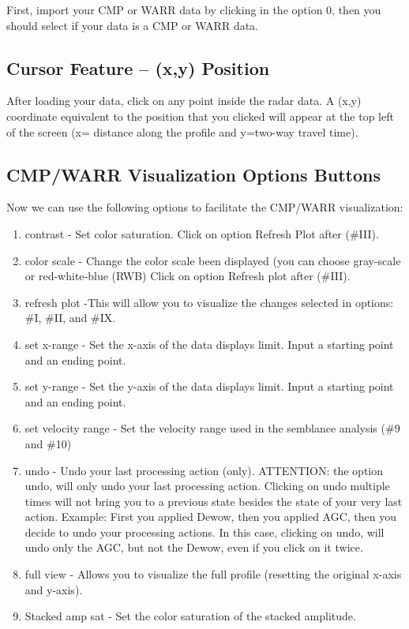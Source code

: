 \documentclass[12pt]{article}
\begin{document}
First, import your CMP or WARR data by clicking in the option 0, then you should select if your data is a CMP or WARR data.

	\subsection{Cursor Feature – (x,y) Position}
	
	After loading your data, click on any point inside the radar data. A (x,y) coordinate equivalent to the position that you clicked will appear at the top left of the screen (x= distance along the profile and y=two-way travel time). 
	

	\subsection{CMP/WARR Visualization Options Buttons }
	
	Now we can use the following options to facilitate the CMP/WARR visualization: 

\begin{enumerate}[label=\Roman*.]

    \item contrast - Set color saturation.  Click on option Refresh Plot after (\#III).

    \item color scale - Change the color scale been displayed (you can choose gray-scale or red-white-blue (RWB) Click on option Refresh plot after (\#III).

    \item refresh plot -This will allow you to visualize the changes selected in options: \#I, \#II, and \#IX.
    
    \item set x-range - Set the x-axis of the data displays limit. Input a starting point and an ending point.

    \item set y-range - Set the y-axis of the data displays limit. Input a starting point and an ending point.
 
    \item set velocity range - Set the velocity range used in the semblance analysis (\#9 and \#10)
 
    \item undo - Undo your last processing action (only). 
ATTENTION: the option undo, will only undo your last processing action. Clicking on undo multiple times will not bring you to a previous state besides the state of your very last action.  
Example: First you applied Dewow, then you applied AGC, then you decide to undo your processing actions. In this case, clicking on undo, will undo only the AGC, but not the Dewow, even if you click on it twice. 

    \item full view - Allows you to visualize the full profile (resetting the original x-axis and y-axis).

    \item Stacked amp sat - Set the color saturation of the stacked amplitude. 

\end{enumerate}
				
\end{document}
